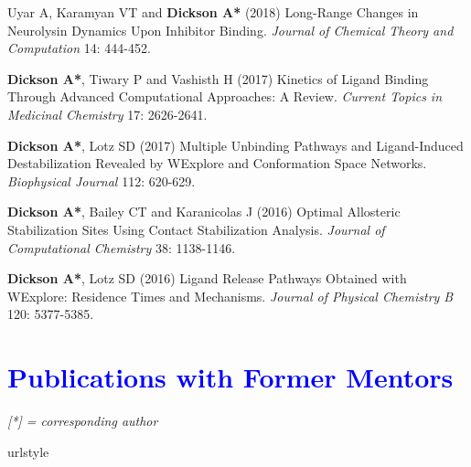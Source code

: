 \documentclass[margin,line]{res}
\begin{document}
\begin{resume}
\begin{spacing}{1.2}
\begin{thebibliography}{10}
Uyar A, Karamyan VT and {\bf Dickson A*} (2018)
Long-Range Changes in Neurolysin Dynamics Upon Inhibitor Binding.
\newblock \textit{Journal of Chemical Theory and Computation} 14: 444-452.

  {\bf Dickson A*}, Tiwary P and Vashisth H (2017)
Kinetics of Ligand Binding Through Advanced Computational Approaches: A Review.
\newblock \textit{Current Topics in Medicinal Chemistry} 17: 2626-2641.

{\bf Dickson A*}, Lotz SD (2017)
Multiple Unbinding Pathways and Ligand-Induced Destabilization Revealed by WExplore and Conformation Space Networks.
\newblock \textit{Biophysical Journal} 112: 620-629. 

{\bf Dickson A*}, Bailey CT and Karanicolas J (2016)
Optimal Allosteric Stabilization Sites Using Contact Stabilization Analysis.
\newblock \textit{Journal of Computational Chemistry} 38: 1138-1146.

{\bf Dickson A*}, Lotz SD (2016)
Ligand Release Pathways Obtained with WExplore: Residence Times and Mechanisms.
\newblock \textit{Journal of Physical Chemistry B} 120: 5377-5385. 

\end{thebibliography}
\end{spacing}
\endgroup

\section{\sc \textcolor{blue}{Publications with Former Mentors}}


\emph{[*] = corresponding author}
\vspace {0.05in}

\begingroup
\begin{spacing}{1.2}
\renewcommand{\section}[2]{}%
\begin{thebibliography}{10}
\providecommand{\url}[1]{\texttt{#1}}
\providecommand{\urlprefix}{URL }
\expandafter\ifx\csname urlstyle\endcsname\relax
  \providecommand{\doi}[1]{doi:\discretionary{}{}{}#1}\else
  \providecommand{\doi}{doi:\discretionary{}{}{}\begingroup
  \urlstyle{rm}\Url}\fi
\providecommand{\bibAnnoteFile}[1]{%
  \IfFileExists{#1}{\begin{quotation}\noindent\textsc{Key:} #1\\
  \textsc{Annotation:}\ \end{quotation}}{}}
\providecommand{\bibAnnote}[2]{%
  \begin{quotation}\noindent\textsc{Key:} #1\\
  \textsc{Annotation:}\ #2\end{quotation}}
\providecommand{\eprint}[2][]{\url{#2}}


\end{thebibliography}
\end{spacing}
\end{resume}
\end{document}

